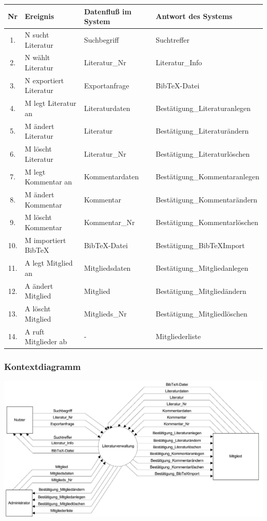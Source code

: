 \begin{longtable}{|c|p{9.0em}|p{10.5em}|l|}
\hline
Nr & Ereignis & Datenfluß im System & Antwort des Systems \\
\hline\hline
\endhead

1. & N sucht Literatur & Suchbegriff & Suchtreffer \\\hline
2. & N wählt Literatur & Literatur\_Nr & Literatur\_Info \\\hline
3. & N exportiert Literatur & Exportanfrage &  BibTeX-Datei \\\hline
4. & M legt Literatur an & Literaturdaten & Bestätigung\_Literaturanlegen \\\hline
5. & M ändert Literatur & Literatur & Bestätigung\_Literaturändern\\\hline
6. & M löscht Literatur & Literatur\_Nr & Bestätigung\_Literaturlöschen \\\hline
7. & M legt Kommentar an & Kommentardaten & Bestätigung\_Kommentaranlegen \\\hline
8. & M ändert Kommentar & Kommentar & Bestätigung\_Kommentarändern \\\hline
9. & M löscht Kommentar & Kommentar\_Nr & Bestätigung\_Kommentarlöschen \\\hline
10.& M importiert BibTeX & BibTeX-Datei & Bestätigung\_BibTeXImport \\\hline
11.& A legt Mitglied an & Mitgliedsdaten & Bestätigung\_Mitgliedanlegen \\\hline
12.& A ändert Mitglied & Mitglied & Bestätigung\_Mitgliedändern \\\hline
13.& A löscht Mitglied & Mitglieds\_Nr & Bestätigung\_Mitgliedlöschen \\\hline
14.& A ruft Mitglieder ab & - & Mitgliederliste \\\hline
\end{longtable}

\newpage %
\subsubsection{Kontextdiagramm}

\includegraphics[scale=0.75]{kontextdiagramm}


